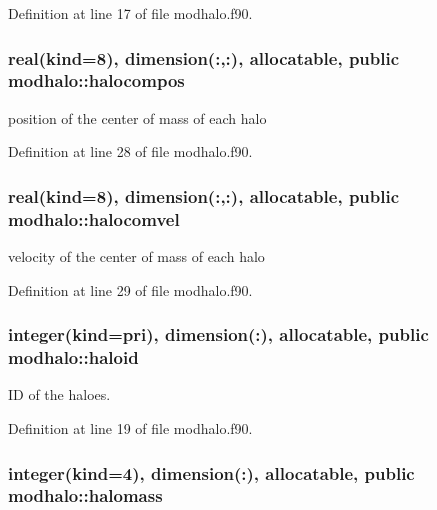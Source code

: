 Definition at line 17 of file modhalo.\-f90.

\hypertarget{classmodhalo_afbee38374bfcb2e59a2a9012bf9e1ac6}{
\subsubsection[{halocompos}]{\setlength{\rightskip}{0pt plus 5cm}real(kind=8), dimension(\-:,\-:), allocatable, public modhalo\-::halocompos}}\label{classmodhalo_afbee38374bfcb2e59a2a9012bf9e1ac6}


position of the center of mass of each halo 



Definition at line 28 of file modhalo.\-f90.

\hypertarget{classmodhalo_acf8ec6b80c5836d34bf47531c2815ce9}{
\subsubsection[{halocomvel}]{\setlength{\rightskip}{0pt plus 5cm}real(kind=8), dimension(\-:,\-:), allocatable, public modhalo\-::halocomvel}}\label{classmodhalo_acf8ec6b80c5836d34bf47531c2815ce9}


velocity of the center of mass of each halo 



Definition at line 29 of file modhalo.\-f90.

\hypertarget{classmodhalo_a123a9c168d495f9bbe3d1e25be025105}{
\subsubsection[{haloid}]{\setlength{\rightskip}{0pt plus 5cm}integer(kind=pri), dimension(\-:), allocatable, public modhalo\-::haloid}}\label{classmodhalo_a123a9c168d495f9bbe3d1e25be025105}


I\-D of the haloes. 



Definition at line 19 of file modhalo.\-f90.

\hypertarget{classmodhalo_ad235215a443e0871d790576ff1ad77c2}{
\subsubsection[{halomass}]{\setlength{\rightskip}{0pt plus 5cm}integer(kind=4), dimension(\-:), allocatable, public modhalo\-::halomass}}\label{classmodhalo_ad235215a443e0871d790576ff1ad77c2}


